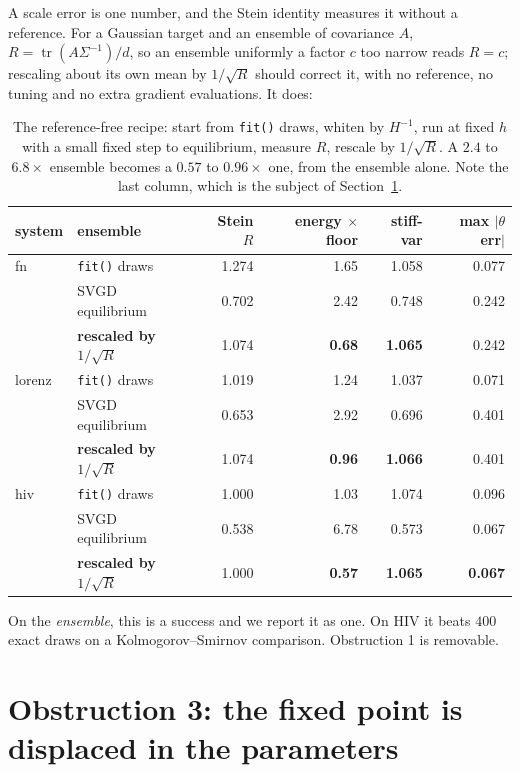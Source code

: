 \documentclass[11pt]{article}
\newcommand{\tr}{\operatorname{tr}}
\newcommand{\code}[1]{\texttt{\small #1}}
\theoremstyle{remark}
\begin{document}
A scale error is one number, and the Stein identity measures it without a reference. For a Gaussian
target and an ensemble of covariance $A$, $R = \tr(A\Sigma^{-1})/d$, so an ensemble uniformly a
factor $c$ too narrow reads $R = c$; rescaling about its own mean by $1/\sqrt R$ should correct it,
with no reference, no tuning and no extra gradient evaluations. It does:

\begin{table}[t]
\centering\small
\begin{tabular}{llrrrr}
\toprule
system & ensemble & Stein $R$ & energy $\times$ floor & stiff-var & max $|\theta$ err$|$\\
\midrule
fn     & \code{fit()} draws        & 1.274 & 1.65 & 1.058 & 0.077\\
       & SVGD equilibrium          & 0.702 & 2.42 & 0.748 & 0.242\\
       & \textbf{rescaled by $1/\sqrt R$} & 1.074 & \textbf{0.68} & \textbf{1.065} & 0.242\\
\midrule
lorenz & \code{fit()} draws        & 1.019 & 1.24 & 1.037 & 0.071\\
       & SVGD equilibrium          & 0.653 & 2.92 & 0.696 & 0.401\\
       & \textbf{rescaled by $1/\sqrt R$} & 1.074 & \textbf{0.96} & \textbf{1.066} & 0.401\\
\midrule
hiv    & \code{fit()} draws        & 1.000 & 1.03 & 1.074 & 0.096\\
       & SVGD equilibrium          & 0.538 & 6.78 & 0.573 & 0.067\\
       & \textbf{rescaled by $1/\sqrt R$} & 1.000 & \textbf{0.57} & \textbf{1.065} & \textbf{0.067}\\
\bottomrule
\end{tabular}
\caption{The reference-free recipe: start from \code{fit()} draws, whiten by $H^{-1}$, run at fixed
$h$ with a small fixed step to equilibrium, measure $R$, rescale by $1/\sqrt R$. A $2.4$ to
$6.8\times$ ensemble becomes a $0.57$ to $0.96\times$ one, from the ensemble alone. Note the last
column, which is the subject of Section~\ref{sec:theta}.}
\label{tab:recipe}
\end{table}

On the \emph{ensemble}, this is a success and we report it as one. On HIV it beats $400$ exact draws
on a Kolmogorov--Smirnov comparison. Obstruction 1 is removable.

\section{Obstruction 3: the fixed point is displaced in the parameters}
\label{sec:theta}
\end{document}
